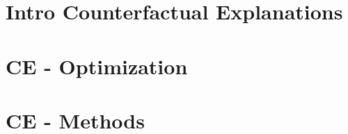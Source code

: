 \documentclass[11pt,compress,t,notes=noshow, aspectratio=169, xcolor=table]{beamer}
\begin{document}



% 
% 
% 

\section{Intro Counterfactual Explanations}


\section{CE - Optimization}


\section{CE - Methods}

\end{document}
